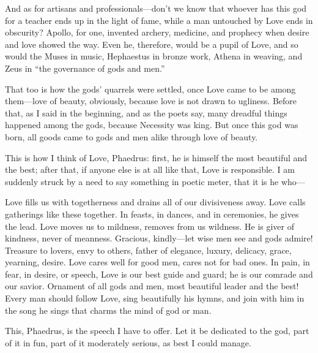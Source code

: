 And as for artisans and professionals---don't we know that whoever has
this god for a teacher ends up in the light of fame, while a man
untouched by Love ends in obscurity? Apollo, for one, invented archery,
 medicine, and prophecy when desire and love showed the way. Even
he, therefore, would be a pupil of Love, and so would the Muses in
music, Hephaestus in bronze work, Athena in weaving, and Zeus in “the
governance of gods and men.”

That too is how the gods' quarrels were settled, once Love came to be
among them---love of beauty, obviously, because love is not drawn to
ugliness. Before that, as I said in the beginning, and as the poets say,
many dreadful things happened among the gods, because Necessity was
king.  But once this god was born, all goods came to gods and men
alike through love of beauty.

This is how I think of Love, Phaedrus: first, he is himself the most
beautiful and the best; after that, if anyone else is at all like that,
Love is responsible. I am suddenly struck by a need to say something in
poetic meter, that it
is he who---

\blank[line]
\par
{}
\blank[line]

Love fills us with togetherness and drains all of our divisiveness away.
Love calls gatherings like these together. In feasts, in dances, and in
ceremonies, he gives the lead. Love moves us to mildness, removes from
us wildness. He is giver of kindness, never of meanness. Gracious,
kindly---let wise men
see and gods admire! Treasure to lovers, envy to others, father of
elegance, luxury, delicacy, grace, yearning, desire. Love cares 
well for good men, cares not for bad ones. In pain, in fear, in desire,
or speech, Love is our best guide and guard; he is our comrade and our
savior. Ornament of all gods and men, most beautiful leader and the
best! Every man should follow Love, sing beautifully his hymns, and join
with him in the song he sings that charms the mind of god or man.

This, Phaedrus, is the speech I have to offer. Let it be dedicated to
the  god, part of it in fun, part of it moderately
serious, as best I could manage.

